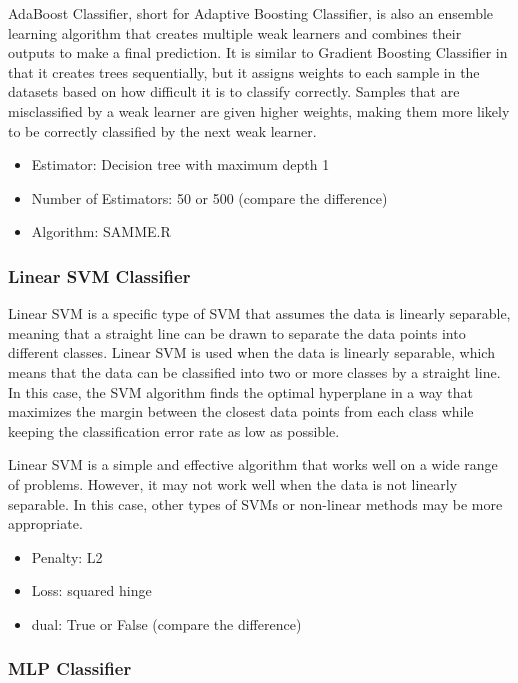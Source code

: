 \documentclass[twocolumn, draft]{extarticle}
\begin{document}
AdaBoost Classifier, short for Adaptive Boosting Classifier, is also an ensemble learning algorithm that creates multiple weak learners and combines their outputs to make a final prediction. It is similar to Gradient Boosting Classifier in that it creates trees sequentially, but it assigns weights to each sample in the datasets based on how difficult it is to classify correctly. Samples that are misclassified by a weak learner are given higher weights, making them more likely to be correctly classified by the next weak learner.

\begin{itemize}
\item Estimator: Decision tree with maximum depth 1
\item Number of Estimators: 50 or 500 (compare the difference)
\item Algorithm: SAMME.R
\end{itemize}

\subsubsection{Linear SVM Classifier}

Linear SVM is a specific type of SVM that assumes the data is linearly separable, meaning that a straight line can be drawn to separate the data points into different classes. Linear SVM is used when the data is linearly separable, which means that the data can be classified into two or more classes by a straight line. In this case, the SVM algorithm finds the optimal hyperplane in a way that maximizes the margin between the closest data points from each class while keeping the classification error rate as low as possible.

Linear SVM is a simple and effective algorithm that works well on a wide range of problems. However, it may not work well when the data is not linearly separable. In this case, other types of SVMs or non-linear methods may be more appropriate.

\begin{itemize}
\item Penalty: L2
\item Loss: squared hinge
\item dual: True or False (compare the difference)
\end{itemize}

\subsubsection{MLP Classifier}
\end{document}
